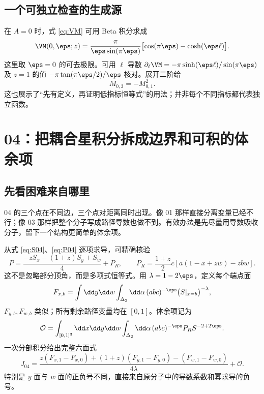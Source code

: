 \section{一个可独立检查的生成源}
在 $A=0$ 时，式 \eqref{eq:VM} 可用 Beta 积分求成
\begin{equation}
\VM(0,\eps;z)=\frac{\pi}{\eps\sin(\pi\eps)}
\bigl[\cos(\pi\eps)-\cosh(\eps\ell)\bigr].
\end{equation}
这里取 $\eps=0$ 的可去极限。可用 $\ell$ 导数
$\partial_\ell\VM=-\pi\sinh(\eps\ell)/\sin(\pi\eps)$
及 $z=1$ 的值 $-\pi\tan(\pi\eps/2)/\eps$ 核对。展开二阶给
\begin{equation}
M_{0,3}=-M_{0,1}^2.
\end{equation}
这也展示了“先有定义，再证明低指标恒等式”的用法；并非每个不同指标都代表独立函数。

\chapter{04：把耦合星积分拆成边界和可积的体余项}
\section{先看困难来自哪里}
04 的三个点在不同边，三个点对距离同时出现。像 01 那样直接分离变量已经不行；像 03 那样把整个分子写成路径导数也做不到。有效办法是先尽量用导数吸收分子，留下一个结构更简单的体余项。

从式 \eqref{eq:S04}、\eqref{eq:P04} 逐项求导，可精确核验
\begin{equation}
P=\frac{-zS_x-(1+z)S_y+S_w}{4}+P_R,
\qquad
P_R=\frac{1+z}{2}c[a(1-x+zw)-zbw].
\label{eq:P04IBP}
\end{equation}
这不是忽略部分顶角，而是多项式恒等式。用 $\lambda=1-2\eps$，定义每个端点面
\[
F_{x,b}=\int\dd y\dd w\int_{\Delta_2}\dd\alpha\,(abc)^{-\eps}
\bigl(S|_{x=b}\bigr)^{-\lambda},
\]
$F_{y,b},F_{w,b}$ 类似；所有剩余路径变量均在 $[0,1]$。体余项记为
\[
\mathcal O=\int_{[0,1]^3}\dd x\dd y\dd w
\int_{\Delta_2}\dd\alpha\,(abc)^{-\eps}P_RS^{-2+2\eps}.
\]
一次分部积分给出完整六面式
\begin{equation}
J_{04}=\frac{z(F_{x,1}-F_{x,0})+(1+z)(F_{y,1}-F_{y,0})-(F_{w,1}-F_{w,0})}{4\lambda}
+\mathcal O.
\label{eq:sixfaces}
\end{equation}
特别是 $y$ 面与 $w$ 面的正负号不同，直接来自原分子中的导数系数和幂求导的负号。


